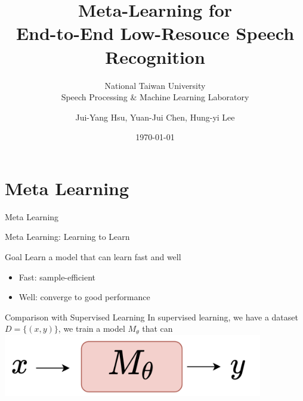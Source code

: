 \documentclass{beamer}
\title{Meta-Learning for\\ End-to-End Low-Resouce Speech Recognition}
\subtitle{\textcolor[rgb]{0.00,0.50,1.00}{{National Taiwan University \\ Speech Processing \& Machine Learning Laboratory}}}
\author{Jui-Yang Hsu, Yuan-Jui Chen, Hung-yi Lee}
\date{\today}
\begin{document}
\begin{frame}
\maketitle
\end{frame}

\section{Meta Learning}

\begin{frame}
	\begin{center}
    \LARGE{Meta Learning}
	\end{center}
\end{frame}

\begin{frame}[t]{Meta Learning: Learning to Learn}
  \begin{block}{Goal}
    Learn a model that can learn fast and well
    \begin{itemize}
      \item Fast: sample-efficient
      \item Well: converge to good performance
    \end{itemize}
  \end{block}


\end{frame}


\begin{frame}[t]{Comparison with Supervised Learning}
  In supervised learning, we have a dataset $D = \lbrace (x,y) \rbrace$, we train a model $M_\theta$ that can 
  \center \includegraphics[width=0.85\textwidth]{fig/sup_learning.png}
\end{frame}
\end{document}
